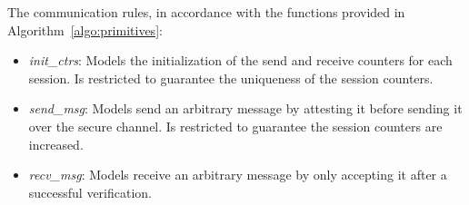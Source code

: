 The communication rules, in accordance with the functions provided in Algorithm~\ref{algo:primitives}:
\begin{itemize}

\item \emph{init\_ctrs}: Models the initialization of the send and receive counters for each session. Is restricted to guarantee the uniqueness of the session counters.
\item \emph{send\_msg}: Models send an arbitrary message by attesting it before sending it over the secure channel. Is restricted to guarantee the session counters are increased.
\item \emph{recv\_msg}: Models receive an arbitrary message by only accepting it after a successful verification.

\end{itemize}

